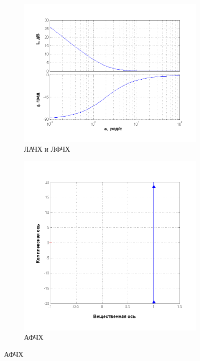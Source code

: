 \documentclass[a4paper, 11pt, russian]{article}
\begin{document}
    \begin{figure}[ht!]
        \centering
        \begin{subfigure}[h]{0.48\textwidth}
            \includegraphics[width = \textwidth]{isodromusLinkBode}
            \caption{ЛАЧХ и ЛФЧХ}
        \end{subfigure}
        \hfill
        \begin{subfigure}[h]{0.48\textwidth}
            \includegraphics[width = \textwidth]{isodromusLinkNyquist}
            \caption{АФЧХ}
        \end{subfigure}
        

\end{figure}
\end{document}
